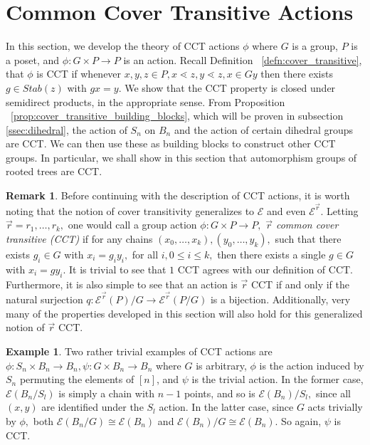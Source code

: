 \documentclass[10 pt]{amsart}
\theoremstyle{plain}
\theoremstyle{definition}
\newtheorem{rem}[thm]{Remark}
\newtheorem{eg}[thm]{Example}
\theoremstyle{remark}
\numberwithin{equation}{section}
\renewcommand{\vec}[1]{\overrightarrow{#1}}
\begin{document}
\section{Common Cover Transitive Actions}
\label{sec:cover_transitive}
In this section, we develop the theory of CCT actions $\phi$ where $G$ is a group, $P$ is a poset, and $\phi:G\times P \rightarrow P$ is an action. Recall Definition ~\ref{defn:cover_transitive}, that $\phi$ is CCT if whenever $x,y,z \in P,x\lessdot z,y\lessdot z,x \in Gy$ then there exists $g \in Stab(z)$ with $gx = y$.  We show that the CCT property is closed under semidirect products, in the appropriate sense. From Proposition ~\ref{prop:cover_transitive_building_blocks}, which will be proven in subsection \ref{ssec:dihedral}, the action of $S_n$ on $B_n$ and the action of certain dihedral groups are CCT. We can then use these as building blocks to construct other CCT groups. In particular, we shall show in this section that automorphism groups of rooted trees are CCT.

\begin{rem}
Before continuing with the description of CCT actions, it is worth noting that the notion of cover transitivity generalizes to $\mathcal E$ and even $\mathcal E^{\vec r}.$ Letting $\vec r = r_1,\ldots, r_k,$ one would call a group action $\phi:G\times P \rightarrow P,$ {\it $\vec r$ common cover transitive (CCT)} if for any chains $(x_0,\ldots, x_k),(y_0,\ldots, y_k),$ such that there exists $g_i \in G$ with $x_i = g_i y_i,$ for all $i,0\leq i \leq k,$ then there exists a single $g \in G$ with $x_i = g y_i.$ It is trivial to see that $1$ CCT agrees with our definition of CCT. Furthermore, it is also simple to see that an action is $\vec r$ CCT if and only if the natural surjection $q:\mathcal E^{\vec r}(P)/G \rightarrow \mathcal E^{\vec r}(P/G)$ is a bijection. Additionally, very many of the properties developed in this section will also hold for this generalized notion of $\vec r$ CCT.
\end{rem}

\begin{eg}
\label{eg:trivial_edgequot}
Two rather trivial examples of CCT actions are $\phi:S_n\times B_n \rightarrow B_n,\psi:G\times B_n\rightarrow B_n$ where $G$ is arbitrary, $\phi$ is the action induced by $S_n$ permuting the elements of $[n]$, and $\psi$ is the trivial action. In the former case, $\mathcal E(B_n/S_l)$ is simply a chain with $n-1$ points, and so is $\mathcal E(B_n)/S_l,$ since all $(x, y)$ are identified under the $S_l$ action. In the latter case, since $G$ acts trivially by $\phi,$ both  $\mathcal E(B_n/G) \cong \mathcal E(B_n)$ and $\mathcal E(B_n)/G \cong \mathcal E(B_n).$ So again, $\psi$ is CCT.
\end{eg}
\end{document}
